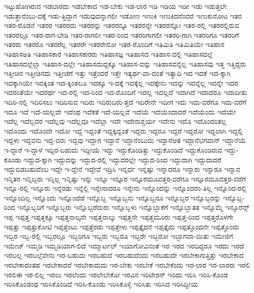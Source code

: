 {ಇಟ್ಟುಹೋಗಿರುವ
ಇಡಬಾರದು
ಇಡಬೇಕಾದ
ಇಡ-ಬೇಕು
ಇಡ-ಲಾರ
ಇಡಿ
ಇಡಿಯ
ಇಡೀ
ಇಡು
ಇಡುತ್ತಲೇ
ಇಡುತ್ತಾನೆಂಬು-ದಕ್ಕೆ
ಇಡು-ತ್ತಿದ್ದಾಗ
ಇಡುವುದನ್ನಾಗಲೀ
ಇಡೋಣ
ಇಣುಕಿ
ಇಣುಕಿದನೆಂದರೆ
ಇಣುಕುನೋಟ
ಇತರ
ಇತರ-ರೊಡನೆ
ಇತರರ
ಇತರರದು
ಇತರರನ್ನು
ಇತರರನ್ನೂ
ಇತರರನ್ನೇ
ಇತರರನ್ನೋ
ಇತರ-ರಲ್ಲಿ
ಇತರರಲ್ಲಿರುವ
ಇತರರಲ್ಲೂ
ಇತರ-ರಾಗ-ಬೇಡಿ
ಇತರ-ರಾಗಲೀ
ಇತರ-ರಿಂದ
ಇತರರಿಗಾಗಲೀ
ಇತರರಿ-ಗಾಗಿ
ಇತರರಿಗೂ
ಇತರರಿಗೆ
ಇತರರು
ಇತರರೂ
ಇತರರೆಲ್ಲ
ಇತರರೇ
ಇತರರೇನೋ
ಇತರ-ರೊಂದಿಗೆ
ಇತಿಮಿತಿ
ಇತಿಮಿತಿಯೇ
ಇತಿಹಾಸ
ಇತಿಹಾಸಅತಿ
ಇತಿಹಾಸಕಾರ
ಇತಿಹಾಸಕಾರರು
ಇತಿಹಾಸಜ್ಞ
ಇತಿಹಾಸದ
ಇತಿಹಾಸ-ದಲ್ಲಿ
ಇತಿಹಾಸದಲ್ಲೆ
ಇತಿಹಾಸದಲ್ಲೆಲ್ಲಾ
ಇತಿಹಾಸ-ದಲ್ಲೇ
ಇತಿಹಾಸದುದ್ದಕ್ಕೂ
ಇತಿಹಾಸ-ವನ್ನು
ಇತಿಹಾಸವನ್ನೆಲ್ಲ
ಇತಿಹಾಸವು
ಇತ್ತ
ಇತ್ತಿದ್ದರು
ಇತ್ತೀಚಿನ
ಇತ್ತೀಚಿನದು
ಇತ್ತೀಚೆಗೆ
ಇತ್ತು
ಇತ್ತೆಂದರೆ
ಇತ್ತೇ
ಇತ್ಯರ್ಥ-ವಾ-ದಂತೆ
ಇತ್ಯಾದಿ
ಇದ
ಇದಕೆ
ಇದ-ಕ್ಕಾಗಿ
ಇದಕ್ಕಾಗಿಯೇ
ಇದಕ್ಕಿಂತ
ಇದ-ಕ್ಕಿಂತಲೂ
ಇದಕ್ಕೂ
ಇ-ದಕ್ಕೆ
ಇದಕ್ಕೆಲ್ಲ
ಇದಕ್ಕೇನು
ಇದನ್ನು
ಇದನ್ನೆಲ್ಲ
ಇದನ್ನೇ
ಇದರ
ಇದರಂತೆಯೇ
ಇದರರ್ಥ
ಇದ-ರಲ್ಲಿ
ಇದ-ರಿಂದ
ಇದ-ರೊಂದಿಗೆ
ಇದಲ್ಲ
ಇದಲ್ಲದೆ
ಇದಾಗಿದೆ
ಇದಾದರೂ
ಇದಾದೀತು
ಇದಿರಿ-ನಲ್ಲಿ
ಇದಿರಿಸಲು
ಇದಿರಿಸುವ
ಇದಿರು
ಇದಿರುಬರು-ತ್ತದೆ
ಇದಿರೇನೇ
ಇದೀಗ
ಇದು
ಇದು-ವರೆಗೂ
ಇದು-ವರೆಗೆ
ಇದೂ
ಇದೆ
ಇದೆ-ಯಲ್ಲವೇ
ಇದೆಂಥ
ಇದೆಕತೆ
ಇದೆ-ಯಲ್ಲವೆ
ಇದೆಯೆ
ಇದೆಯೆಂದಾದರೆ
ಇದೆಯೆಂದು
ಇದೆಯೇ
ಇದೆಲ್ಲ
ಇದೆಲ್ಲದರ
ಇದೆಲ್ಲವು
ಇದೆಲ್ಲವೂ
ಇದೆಲ್ಲಾ
ಇದೇ
ಇದೇನಾಶ್ಚರ್ಯ
ಇದೇನು
ಇದೊ
ಇದೊಂದಂತಲ್ಲ
ಇದೊಂದು
ಇದೊಂದೇ
ಇದೋ
ಇದ್ದ
ಇದ್ದಂತೆ
ಇದ್ದಕ್ಕಿದ್ದಂತೆ
ಇದ್ದರು
ಇದ್ದರೂ
ಇದ್ದರೆ
ಇದ್ದರೋ
ಇದ್ದಲಾಗಿ
ಇದ್ದಲ್ಲಿ
ಇದ್ದಳು
ಇದ್ದವನು
ಇದ್ದ-ವರು
ಇದ್ದವು
ಇದ್ದಾಗ
ಇದ್ದಾನೆ
ಇದ್ದಾನೆಂಬುದು
ಇದ್ದಾನೆಆತ
ಇದ್ದಾನೆಭಗವಾನ್
ಇದ್ದಾನೆಯೆ
ಇ-ದ್ದಾರೆ
ಇ-ದ್ದಾಳೆ
ಇದ್ದಿರ-ಬಹುದು
ಇದ್ದೀಯೆ
ಇದ್ದು
ಇದ್ದುಕೊಂಡಿತ್ತು
ಇದ್ದುಕೊಂಡಿದೆ
ಇದ್ದುಕೊಂಡಿರುವ
ಇದ್ದು-ಕೊಂಡು
ಇದ್ದುದ-ಕ್ಕಾಗಿ
ಇದ್ದುದನ್ನು
ಇದ್ದುದ-ರಲ್ಲಿ
ಇದ್ದುದರಲ್ಲೇ
ಇದ್ದುದ-ರಿಂದ
ಇದ್ದುದಾಗಿ
ಇದ್ದುದಾದರೆ
ಇದ್ದುಬಿಡಬಹುದೆಂಬ
ಇದ್ದೇ
ಇ-ದ್ದೇನೆ
ಇದ್ದೇವೆ
ಇದ್ರಿಸಿ
ಇನ್ನರ್ಧ
ಇನ್ನಷ್ಟು
ಇನ್ನಾದರೂ
ಇನ್ನಾರು
ಇನ್ನಾರೂ
ಇನ್ನಾವ
ಇನ್ನಿತರ
ಇನ್ನಿಬ್ಬರು
ಇನ್ನಿಲ್ಲ
ಇನ್ನಿಷ್ಟು
ಇನ್ನು
ಇನ್ನೂ
ಇನ್ನೂರ
ಇನ್ನೂರಮೂವತ್ತರ-ವರೆಗೂ
ಇನ್ನೂರಮೂವತ್ತರ-ವರೆಗೆ
ಇನ್ನೂ-ರಲ್ಲಿ
ಇನ್ನೂರು
ಇನ್ನೆರಡು
ಇನ್ನೆಲ್ಲಿ
ಇನ್ನೇನಾದರೂ
ಇನ್ನೇನು
ಇನ್ನೊಂದನ್ನು
ಇನ್ನೊಂದರಂ-ತಿಲ್ಲ
ಇನ್ನೊಂದ-ರಲ್ಲಿ
ಇನ್ನೊಂದಿಲ್ಲ
ಇನ್ನೊಂದು
ಇನ್ನೊಂದೆಡೆ
ಇನ್ನೊಬ್ಬ
ಇನ್ನೊಬ್ಬನು
ಇನ್ನೊಬ್ಬನೂ
ಇನ್ನೊಬ್ಬರ
ಇನ್ನೊಬ್ಬರನ್ನು
ಇನ್ನೊಬ್ಬ-ರಿಂದ
ಇನ್ನೊಬ್ಬರಿಗೆ
ಇನ್ನೊಬ್ಬರು
ಇನ್ನೊಬ್ಬರೆದುರು
ಇನ್ನೊಬ್ಬಳು
ಇನ್ನೊಬ್ಬಾಕೆಗೆ
ಇನ್ನೊಬ್ಬಾತತ
ಇನ್ನೊಮ್ಮೆ
ಇನ್ಶೂರೆನ್ಸ್
ಇಪ್ಪ
ಇಪ್ಪತ್ತ
ಇಪ್ಪತ್ತಕ್ಕೂ
ಇಪ್ಪತ್ತನಾಲ್ಕನೇ
ಇಪ್ಪತ್ತನಾಲ್ಕು
ಇಪ್ಪತ್ತನೇ
ಇಪ್ಪತ್ತಮೂರು
ಇಪ್ಪತ್ತ-ರಿಂದ
ಇಪ್ಪತ್ತರೊಳಗೇ
ಇಪ್ಪತ್ತು
ಇಪ್ಪತ್ತುಕೋಟಿ
ಇಪ್ಪತ್ತೆಂಟು
ಇಪ್ಪತ್ತೆರಡು
ಇಪ್ಪತ್ತೇಳು
ಇಪ್ಪತ್ತೈದನೆ
ಇಪ್ಪತ್ತೈದು
ಇಪ್ಪತ್ತೊಂದನೇ
ಇಪ್ಪತ್ತೊಂದು
ಇಬ್ಬರ
ಇಬ್ಬ-ರಲ್ಲಿ
ಇಬ್ಬರಲ್ಲೂ
ಇಬ್ಬರಿಗೂ
ಇಬ್ಬರು
ಇಬ್ಬರೂ
ಇಬ್ಬರೇ
ಇಬ್ಬರೋ
ಇಬ್ಭಾಗವಾ-ಯಿತು
ಇಮೇಜಿಗೆ
ಇಮೇಜ್
ಇಮ್ಮಡಿ
ಇಮ್ಮಡಿಯಾಗ-ಲಿದೆ
ಇಮ್ಮಾರ್ಟಲ್
ಇಯಾಗೋವಿನಂತೆ
ಇರ
ಇರದ
ಇರದಿದ್ದರೂ
ಇರದು
ಇರದೆ
ಇರಬಲ್ಲ
ಇರಬಲ್ಲೆವೇನು
ಇರ-ಬಹುದು
ಇರಬಹುದೆ
ಇರಬಹುದೆಂದು
ಇರಬಹುದೇ
ಇರಬೇಕಾಗುತ್ತಿತ್ತು
ಇರಬೇಕಾದ
ಇರಬೇಕಾದಂತಹ
ಇರಬೇಕಾದರೆ
ಇರಬೇಕಾದುದು
ಇರ-ಬೇಕು
ಇರಬೇಕೆ
ಇರಬೇಕೆಂದು
ಇರ-ಲಾರ
ಇರ-ಲಾರರು
ಇರಲಿ
ಇರಲಿಈ
ಇರ-ಲಿಲ್ಲ
ಇರಲು
ಇರಲೆಂದು
ಇರಲೇಬೇಕೋ
ಇರವಿನ
ಇರಿಟೇಶನ್
ಇರಿದು
ಇರಿಸಿ
ಇರಿಸಿ-ಕೊಂಡ
ಇರಿಸಿಕೊಂಡಂಥ
ಇರಿಸಿಕೊಂಡಿದೆ
ಇರಿಸಿ-ಕೊಂಡು
ಇರಿಸಿಕೊಳ್ಳಿ
ಇರಿಸಿತು
ಇರಿಸಿದ
ಇರಿಸಿದ್ದೀಯ
}
